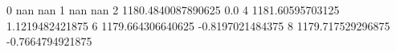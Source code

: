 0 nan nan
1 nan nan
2 1180.4840087890625 0.0
4 1181.60595703125 1.1219482421875
6 1179.664306640625 -0.8197021484375
8 1179.717529296875 -0.7664794921875
